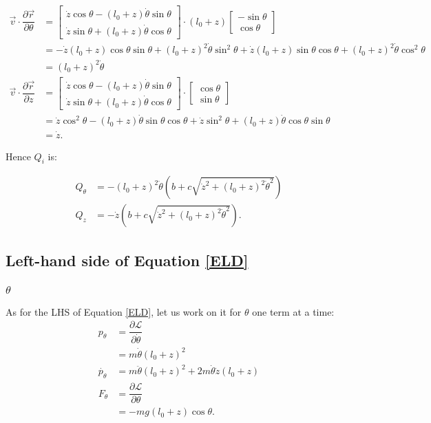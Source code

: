 \documentclass[12pt,a4paper,portrait]{article}
\begin{document}
\begin{align*}
	\vec{v} \cdot \dfrac{\partial \vec{r}}{\partial \theta} &= \begin{bmatrix}
		\dot{z}\cos{\theta} - (l_0+z)\dot{\theta}\sin{\theta} \\
		\dot{z}\sin{\theta} + (l_0+z)\dot{\theta}\cos{\theta}
	\end{bmatrix} \cdot (l_0+z)\begin{bmatrix}
		-\sin{\theta} \\
		\cos{\theta}
	\end{bmatrix} \\
	&= -\dot{z}(l_0+z)\cos{\theta} \sin{\theta} + (l_0+z)^2 \dot{\theta}\sin^2{\theta} + \dot{z}(l_0+z)\sin{\theta} \cos{\theta} +(l_0+z)^2\dot{\theta}\cos^2{\theta} \\
	&= (l_0+z)^2 \dot{\theta} \\
	\vec{v} \cdot \dfrac{\partial \vec{r}}{\partial z} &= \begin{bmatrix}
		\dot{z}\cos{\theta} - (l_0+z)\dot{\theta}\sin{\theta} \\
		\dot{z}\sin{\theta} + (l_0+z)\dot{\theta}\cos{\theta}
	\end{bmatrix} \cdot \begin{bmatrix}
		\cos{\theta} \\
		\sin{\theta}
	\end{bmatrix} \\
	&= \dot{z}\cos^2{\theta} - (l_0+z)\dot{\theta} \sin{\theta}\cos{\theta} + \dot{z}\sin^2{\theta} + (l_0+z)\dot{\theta}\cos{\theta}\sin{\theta} \\
	&= \dot{z}. 
\end{align*}

Hence $Q_i$ is:

\begin{align*}
	Q_{\theta} &= -(l_0+z)^2 \dot{\theta} \left(b+c\sqrt{\dot{z}^2+(l_0+z)^2\dot{\theta}^2}\right) \\
	Q_z &= -\dot{z}\left(b+c\sqrt{\dot{z}^2+(l_0+z)^2\dot{\theta}^2}\right).
\end{align*}

\subsection{Left-hand side of Equation \eqref{ELD}}
\subsubsection{$\theta$}
As for the LHS of Equation \eqref{ELD}, let us work on it for $\theta$ one term at a time:
\begin{align*}
	p_{\theta} &= \dfrac{\partial \mathcal{L}}{\partial \dot{\theta}} \\
	&= m\dot{\theta}(l_0+z)^2 \\
	\dot{p_{\theta}} &= m\ddot{\theta} (l_0+z)^2 + 2m\dot{\theta}\dot{z}(l_0+z) \\
	F_{\theta} &= \dfrac{\partial \mathcal{L}}{\partial \theta} \\
	&= -mg(l_0+z)\cos{\theta}.
\end{align*}
\end{document}
